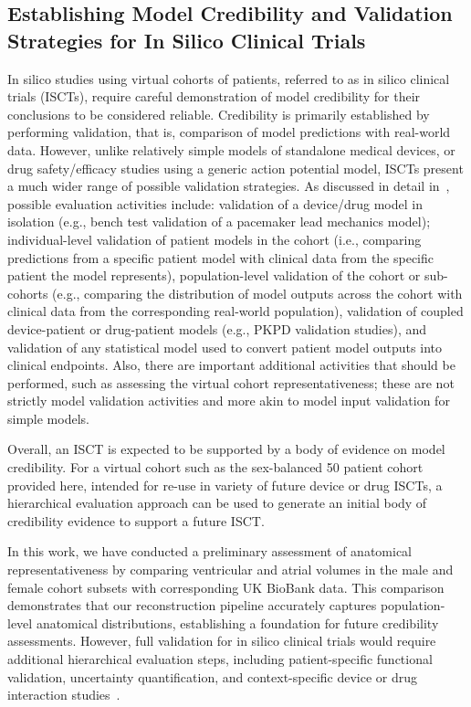 \subsection{Establishing Model Credibility and Validation Strategies for In Silico Clinical Trials}
In silico studies using virtual cohorts of patients, referred to as in silico clinical trials (ISCTs), 
require careful demonstration of model credibility for their conclusions to be considered reliable. 
Credibility is primarily established by performing validation, that is, comparison of model predictions 
with real-world data. 
However, unlike relatively simple models of standalone medical devices, or drug safety/efficacy studies 
using a generic action potential model, ISCTs present a much wider range of possible validation strategies. 
As discussed in detail in~\cite{pathmanathan-credibility-2024}, possible evaluation activities include: 
validation of a device/drug model in isolation 
(e.g., bench test validation of a pacemaker lead mechanics model); 
individual-level validation of patient models in the cohort 
(i.e., comparing predictions from a specific patient model with clinical data from the specific patient 
the model represents), 
population-level validation of the cohort or sub-cohorts 
(e.g., comparing the distribution of model outputs across the cohort with clinical data from the 
corresponding real-world population), 
validation of coupled device-patient or drug-patient models 
(e.g., PKPD validation studies), 
and validation of any statistical model used to convert patient model outputs into clinical endpoints. 
Also, there are important additional activities that should be performed, such as assessing the virtual 
cohort representativeness; 
these are not strictly model validation activities and more akin to model input validation for 
simple models.
 
Overall, an ISCT is expected to be supported by a body of evidence on model credibility. 
For a virtual cohort such as the sex-balanced 50 patient cohort provided here, 
intended for re-use in variety of future device or drug ISCTs, 
a hierarchical evaluation approach can be used to generate an initial body of credibility evidence 
to support a future ISCT.

In this work, we have conducted a preliminary assessment of anatomical representativeness 
by comparing ventricular and atrial volumes in the male and female cohort subsets with 
corresponding UK BioBank data. This comparison demonstrates that our reconstruction pipeline 
accurately captures population-level anatomical distributions, establishing a foundation 
for future credibility assessments. However, full validation for in silico clinical trials 
would require additional hierarchical evaluation steps, including patient-specific 
functional validation, uncertainty quantification, and context-specific device or drug 
interaction studies~\cite{pathmanathan-credibility-2024}.
 
